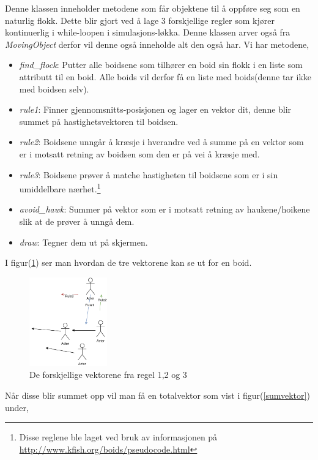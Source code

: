 \documentclass[10pt]{article}
\begin{document}
{Denne klassen inneholder metodene som får objektene til å oppføre seg som en naturlig flokk. Dette blir gjort ved å lage 3 forskjellige regler som kjører kontinuerlig i while-loopen i simulasjons-løkka. Denne klassen arver også fra \emph{MovingObject} derfor vil denne også inneholde alt den også har. Vi har metodene,

\begin{itemize}
    \item \emph{find\_flock}: Putter alle boidsene som tilhører en boid sin flokk i en liste som attributt til en boid. Alle boids vil derfor få en liste med boids(denne tar ikke med boidsen selv).
    \item \emph{rule1}: Finner gjennomsnitts-posisjonen og lager en vektor dit, denne blir summet på hastighetsvektoren til boidsen.
    \item \emph{rule2}: Boidsene unngår å kræsje i hverandre ved å summe på en vektor som er i motsatt retning av boidsen som den er på vei å kræsje med.
    \item \emph{rule3}: Boidsene prøver å matche hastigheten til boidsene som er i sin umiddelbare nærhet.\footnote{Disse reglene ble laget ved bruk av informasjonen på \url{http://www.kfish.org/boids/pseudocode.html}}
    \item \emph{avoid\_hawk}: Summer på vektor som er i motsatt retning av haukene/hoikene slik at de prøver å unngå dem.
    \item \emph{draw}: Tegner dem ut på skjermen.
\end{itemize}

I figur(\ref{rules}) ser man hvordan de tre vektorene kan se ut for en boid.
\begin{figure}[hbt!]
{\centering
    \includegraphics[width=0.30\textwidth]{rules.pdf}
    \caption{De forskjellige vektorene fra regel 1,2 og 3}
    \label{rules}
\par}
\end{figure}

Når disse blir summet opp vil man få en totalvektor som vist i figur(\ref{sumvektor}) under,

}
\end{document}
